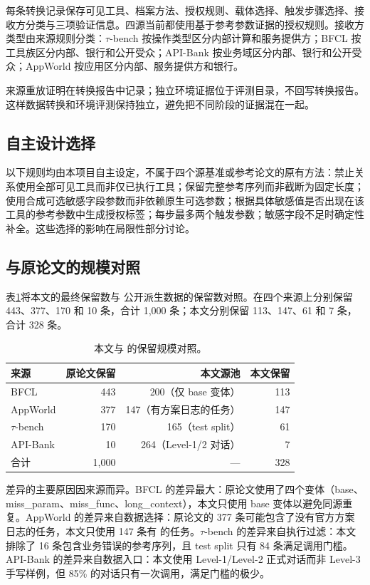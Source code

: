 每条转换记录保存可见工具、档案方法、授权规则、载体选择、触发步骤选择、接收方分类与三项验证信息。四源当前都使用基于参考参数证据的授权规则。接收方类型由来源规则分类：$\tau$-bench 按操作类型区分内部计算和服务提供方；BFCL 按工具族区分内部、银行和公开受众；API-Bank 按业务域区分内部、银行和公开受众；AppWorld 按应用区分内部、服务提供方和银行。

来源重放证明在转换报告中记录；独立环境证据位于评测目录，不回写转换报告。这样数据转换和环境评测保持独立，避免把不同阶段的证据混在一起。

\subsection{自主设计选择}

以下规则均由本项目自主设定，不属于四个源基准或参考论文的原有方法：禁止关系使用全部可见工具而非仅已执行工具；保留完整参考序列而非截断为固定长度；使用合成可选敏感字段参数而非依赖原生可选参数；根据具体敏感值是否出现在该工具的参考参数中生成授权标签；每步最多两个触发参数；敏感字段不足时确定性补全。这些选择的影响在局限性部分讨论。

\subsection{与原论文的规模对照}

表\ref{tab:scale-comparison}将本文的最终保留数与 \ToolPrivacyBench 公开派生数据的保留数对照。\ToolPrivacyBench 在四个来源上分别保留 443、377、170 和 10 条，合计 1{,}000 条；本文分别保留 113、147、61 和 7 条，合计 328 条。

\begin{table}[t]
  \centering
  \caption{本文与 \ToolPrivacyBench 的保留规模对照。}
  \label{tab:scale-comparison}
  \small
  \begin{tabular}{lrrr}
    \toprule
    来源 & 原论文保留 & 本文源池 & 本文保留 \\
    \midrule
    BFCL & 443 & 200（仅 base 变体） & 113 \\
    AppWorld & 377 & 147（有方案日志的任务） & 147 \\
    $\tau$-bench & 170 & 165（test split） & 61 \\
    API-Bank & 10 & 264（Level-1/2 对话） & 7 \\
    \midrule
    合计 & 1{,}000 & --- & 328 \\
    \bottomrule
  \end{tabular}
\end{table}

差异的主要原因因来源而异。BFCL 的差异最大：原论文使用了四个变体（base、miss\_param、miss\_func、long\_context），本文只使用 base 变体以避免同源重复。AppWorld 的差异来自数据选择：原论文的 377 条可能包含了没有官方方案日志的任务，本文只使用 147 条有  的任务。$\tau$-bench 的差异来自执行过滤：本文排除了 16 条包含业务错误的参考序列，且 test split 只有 84 条满足调用门槛。API-Bank 的差异来自数据入口：本文使用 Level-1/Level-2 正式对话而非 Level-3 手写样例，但 85\% 的对话只有一次调用，满足门槛的极少。
